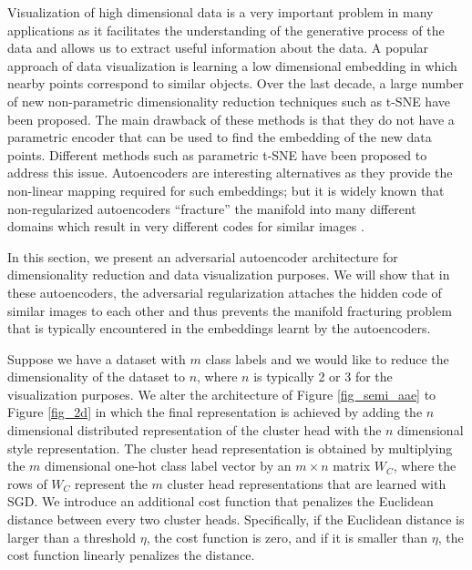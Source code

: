 \documentclass{article}
\begin{document}
Visualization of high dimensional data is a very important problem in many applications as it facilitates the understanding of the generative process of the data and allows us to extract useful information about the data. A popular approach of data visualization is learning a low dimensional embedding in which nearby points correspond to similar objects. Over the last decade, a large number of new non-parametric dimensionality reduction techniques such as t-SNE \citep{tsne} have been proposed. The main drawback of these methods is that they do not have a parametric encoder that can be used to find the embedding of the new data points. Different methods such as parametric t-SNE \citep{param_tsne} have been proposed to address this issue. Autoencoders are interesting alternatives as they provide the non-linear mapping required for such embeddings; but it is widely known that non-regularized autoencoders ``fracture'' the manifold into many different domains which result in very different codes for similar images \citep{geoff_dim_reduce}.

In this section, we present an adversarial autoencoder architecture for dimensionality reduction and data visualization purposes. We will show that in these autoencoders, the adversarial regularization attaches the hidden code of similar images to each other and thus prevents the manifold fracturing problem that is typically encountered in the embeddings learnt by the autoencoders. 

Suppose we have a dataset with $m$ class labels and we would like to reduce the dimensionality of the dataset to $n$, where $n$ is typically 2 or 3 for the visualization purposes. 
We alter the architecture of Figure \ref{fig_semi_aae} to Figure \ref{fig_2d} in which the final representation is achieved by adding the $n$ dimensional distributed representation of the cluster head with the $n$ dimensional style representation. The cluster head representation is obtained by multiplying the $m$ dimensional one-hot class label vector by an $m \times n$ matrix $W_C$, where the rows of $W_C$ represent the $m$ cluster head representations that are learned with SGD. We introduce an additional cost function that penalizes the Euclidean distance between every two cluster heads. Specifically, if the Euclidean distance is larger than a threshold $\eta$, the cost function is zero, and if it is smaller than $\eta$, the cost function linearly penalizes the distance.
\end{document}
